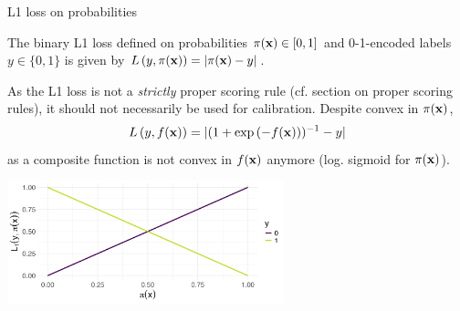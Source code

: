 \documentclass[11pt,compress,t,notes=noshow, xcolor=table]{beamer}
\begin{document}
\begin{vbframe}{L1 loss on probabilities}

The binary L1 loss defined on probabilities $\pi(\mathbf{x}) \in [0, 1]$ and 0-1-encoded labels $y \in \{0, 1\}$ is given by $L\left(y, \pi(\mathbf{x})\right) = |\pi(\mathbf{x}) - y|$.

As the L1 loss is not a \textit{strictly} proper scoring rule (cf. section on proper scoring rules), it should not necessarily be used for calibration. %
Despite convex in $\pi(\mathbf{x})$, $$L\left(y, f(\mathbf{x})\right)=|(1+\exp{(-f(\mathbf{x}))})^{-1}-y|$$ as a composite function is not convex in $f(\mathbf{x})$ anymore (log. sigmoid for $\pi(\mathbf{x})$).
\vspace{-0.2cm}
\begin{center}
\includegraphics[width = 0.6\textwidth]{figure/l1_loss.png}
\end{center}


\end{vbframe}





\endlecture
\end{document}
